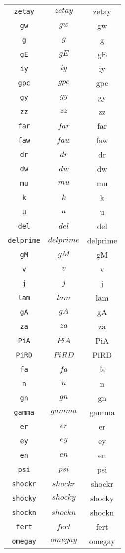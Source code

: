 \begin{center}
\begin{longtable}{ccc}
\texttt{zetay} & $zetay$ & zetay\\
\texttt{gw} & $gw$ & gw\\
\texttt{g} & $g$ & g\\
\texttt{gE} & $gE$ & gE\\
\texttt{iy} & $iy$ & iy\\
\texttt{gpc} & $gpc$ & gpc\\
\texttt{gy} & $gy$ & gy\\
\texttt{zz} & $zz$ & zz\\
\texttt{far} & $far$ & far\\
\texttt{faw} & $faw$ & faw\\
\texttt{dr} & $dr$ & dr\\
\texttt{dw} & $dw$ & dw\\
\texttt{mu} & $mu$ & mu\\
\texttt{k} & $k$ & k\\
\texttt{u} & $u$ & u\\
\texttt{del} & $del$ & del\\
\texttt{delprime} & $delprime$ & delprime\\
\texttt{gM} & $gM$ & gM\\
\texttt{v} & $v$ & v\\
\texttt{j} & $j$ & j\\
\texttt{lam} & $lam$ & lam\\
\texttt{gA} & $gA$ & gA\\
\texttt{za} & $za$ & za\\
\texttt{PiA} & $PiA$ & PiA\\
\texttt{PiRD} & $PiRD$ & PiRD\\
\texttt{fa} & $fa$ & fa\\
\texttt{n} & $n$ & n\\
\texttt{gn} & $gn$ & gn\\
\texttt{gamma} & $gamma$ & gamma\\
\texttt{er} & $er$ & er\\
\texttt{ey} & $ey$ & ey\\
\texttt{en} & $en$ & en\\
\texttt{psi} & $psi$ & psi\\
\texttt{shockr} & $shockr$ & shockr\\
\texttt{shocky} & $shocky$ & shocky\\
\texttt{shockn} & $shockn$ & shockn\\
\texttt{fert} & $fert$ & fert\\
\texttt{omegay} & $omegay$ & omegay\\

\end{longtable}
\end{center}
